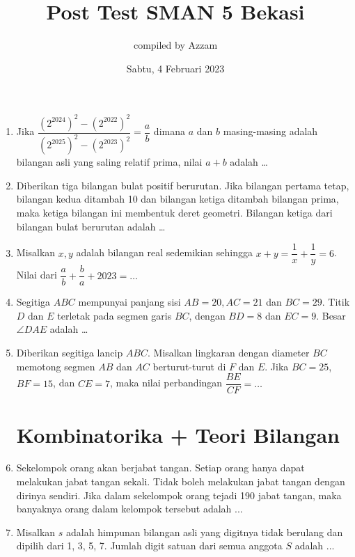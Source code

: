 \documentclass[12pt]{scrartcl}
\title{Post Test SMAN 5 Bekasi}
\author{compiled by Azzam}
\date{Sabtu, 4 Februari 2023}
\begin{document}
\maketitle

\renewcommand*\contentsname{Daftar Isi}
\tableofcontents

\newpage
\begin{enumerate}
    \section{Aljabar + Geometri}
    \item Jika $\dfrac{(2^{2024})^2-(2^{2022})^2}{(2^{2025})^2-(2^{2023})^2}=\dfrac{a}{b}$ dimana $a$ dan $b$ masing-masing adalah bilangan asli yang saling relatif prima, nilai $a+b$ adalah \dots

    \item Diberikan tiga bilangan bulat positif berurutan. Jika bilangan pertama tetap, bilangan kedua ditambah 10 dan bilangan ketiga ditambah bilangan prima, maka ketiga bilangan ini membentuk deret geometri. Bilangan ketiga dari bilangan bulat berurutan adalah \dots

    \item Misalkan $x,y$ adalah bilangan real sedemikian sehingga $x+y=\dfrac{1}{x}+\dfrac{1}{y}=6$. Nilai dari $\dfrac{a}{b}+\dfrac{b}{a}+2023=\dots$

    \item Segitiga $ABC$ mempunyai panjang sisi $AB = 20, AC = 21$ dan $BC = 29$. Titik $D$ dan $E$ terletak pada segmen garis $BC$, dengan $BD = 8$ dan $EC = 9$. Besar $\angle DAE$ adalah \dots

    \item Diberikan segitiga lancip $ABC$. Misalkan lingkaran dengan diameter $BC$ memotong segmen $AB$ dan $AC$ berturut-turut di $F$ dan $E$. Jika $BC=25$, $BF=15$, dan $CE=7$, maka nilai perbandingan $\dfrac{BE}{CF}=\dots$

    \newpage
    \section{Kombinatorika + Teori Bilangan}
    \item Sekelompok orang akan berjabat tangan. Setiap orang hanya dapat melakukan jabat tangan sekali. Tidak boleh melakukan jabat tangan dengan dirinya sendiri. Jika dalam sekelompok orang tejadi 190 jabat tangan, maka banyaknya orang dalam kelompok tersebut adalah ...

    \item Misalkan $s$ adalah himpunan bilangan asli yang digitnya tidak berulang dan dipilih dari 1, 3, 5, 7. Jumlah digit satuan dari semua anggota $S$ adalah ...


\end{enumerate}
\end{document}
